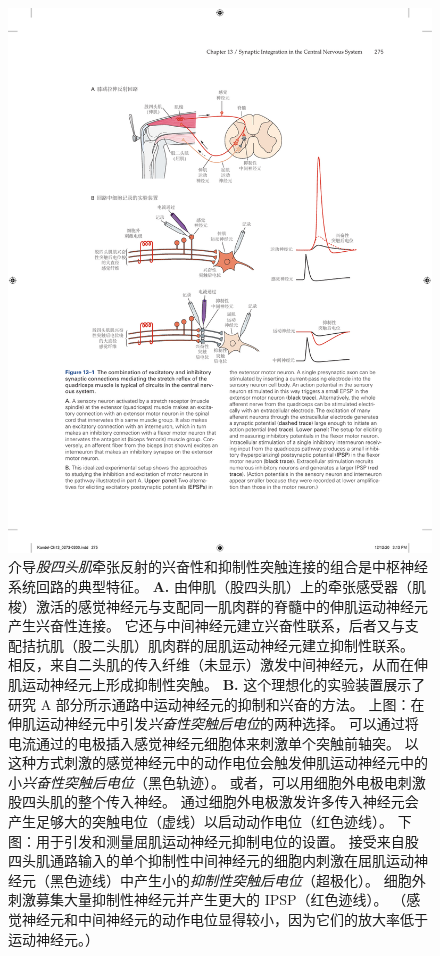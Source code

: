 \begin{figure}[htbp]
	\centering
	\includegraphics[width=0.85\linewidth]{chap13/fig_13_1}
	\caption{介导\textit{股四头肌}牵张反射的兴奋性和抑制性突触连接的组合是中枢神经系统回路的典型特征。
		\textbf{A.} 由伸肌（股四头肌）上的牵张感受器（肌梭）激活的感觉神经元与支配同一肌肉群的脊髓中的伸肌运动神经元产生兴奋性连接。
		它还与中间神经元建立兴奋性联系，后者又与支配拮抗肌（股二头肌）肌肉群的屈肌运动神经元建立抑制性联系。
		相反，来自二头肌的传入纤维（未显示）激发中间神经元，从而在伸肌运动神经元上形成抑制性突触。
		\textbf{B.} 这个理想化的实验装置展示了研究 A 部分所示通路中运动神经元的抑制和兴奋的方法。
		上图：在伸肌运动神经元中引发\textit{兴奋性突触后电位}的两种选择。
		可以通过将电流通过的电极插入感觉神经元细胞体来刺激单个突触前轴突。
		以这种方式刺激的感觉神经元中的动作电位会触发伸肌运动神经元中的小\textit{兴奋性突触后电位}（黑色轨迹）。
		或者，可以用细胞外电极电刺激股四头肌的整个传入神经。
		通过细胞外电极激发许多传入神经元会产生足够大的突触电位（虚线）以启动动作电位（红色迹线）。
		下图：用于引发和测量屈肌运动神经元抑制电位的设置。
		接受来自股四头肌通路输入的单个抑制性中间神经元的细胞内刺激在屈肌运动神经元（黑色迹线）中产生小的\textit{抑制性突触后电位}（超极化）。
		细胞外刺激募集大量抑制性神经元并产生更大的 IPSP（红色迹线）。 （感觉神经元和中间神经元的动作电位显得较小，因为它们的放大率低于运动神经元。）}
	\label{fig:13_1}
\end{figure}


